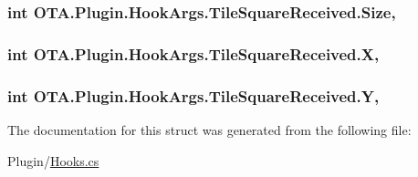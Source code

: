 \subsubsection[{Size}]{\setlength{\rightskip}{0pt plus 5cm}int O\+T\+A.\+Plugin.\+Hook\+Args.\+Tile\+Square\+Received.\+Size\hspace{0.3cm}{\ttfamily [get]}, {\ttfamily [set]}}\label{struct_o_t_a_1_1_plugin_1_1_hook_args_1_1_tile_square_received_afc4e00f95f2c248e1199a59910aefd1c}
\hypertarget{struct_o_t_a_1_1_plugin_1_1_hook_args_1_1_tile_square_received_a3afc2e68719a6dbd127665f32de217d2}{}
\subsubsection[{X}]{\setlength{\rightskip}{0pt plus 5cm}int O\+T\+A.\+Plugin.\+Hook\+Args.\+Tile\+Square\+Received.\+X\hspace{0.3cm}{\ttfamily [get]}, {\ttfamily [set]}}\label{struct_o_t_a_1_1_plugin_1_1_hook_args_1_1_tile_square_received_a3afc2e68719a6dbd127665f32de217d2}
\hypertarget{struct_o_t_a_1_1_plugin_1_1_hook_args_1_1_tile_square_received_a5d3b0759ee398e7d2acb469ece8afb1e}{}
\subsubsection[{Y}]{\setlength{\rightskip}{0pt plus 5cm}int O\+T\+A.\+Plugin.\+Hook\+Args.\+Tile\+Square\+Received.\+Y\hspace{0.3cm}{\ttfamily [get]}, {\ttfamily [set]}}\label{struct_o_t_a_1_1_plugin_1_1_hook_args_1_1_tile_square_received_a5d3b0759ee398e7d2acb469ece8afb1e}


The documentation for this struct was generated from the following file\+:\begin{DoxyCompactItemize}
\item 
Plugin/\hyperlink{_hooks_8cs}{Hooks.\+cs}\end{DoxyCompactItemize}
